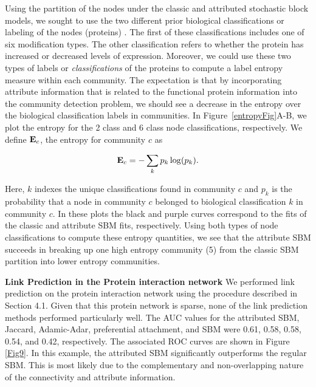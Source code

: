 Using the partition of the nodes under the classic and attributed stochastic block models, we sought to use the two different prior biological classifications or labeling of the nodes (proteins) \cite{bonacci}. The first of these classifications includes one of six modification types. The other classification refers to whether the protein has increased or decreased levels of expression. Moreover, we could use these two types of labels or \emph{classifications} of the proteins to compute a label entropy measure within each community. The expectation is that by incorporating attribute information that is related to the functional protein information into the community detection problem, we should see a decrease in the entropy over the biological classification labels in communities. In Figure~\ref{entropyFig}A-B, we plot the entropy for the 2 class and 6 class node classifications, respectively. We define ${\bf E}_{c}$, the entropy for community $c$ as

\begin{equation}
{\bf E}_{c}=-\sum_{k} p_{k}\log(p_{k}).
\end{equation}

Here, $k$ indexes the unique classifications found in community $c$ and $p_{k}$ is the probability that a node in community $c$ belonged to biological classification $k$ in community $c$. In these plots the black and purple curves correspond to the fits of the classic and attribute SBM fits, respectively. Using both types of node classifications to compute these entropy quantities, we see that the attribute SBM succeeds in breaking up one high entropy community (5) from the classic SBM partition into lower entropy communities. 

{\bf Link Prediction in the Protein interaction network}
We performed link prediction on the protein interaction network using the procedure described in Section 4.1. Given that this protein network is sparse, none of the link prediction methods performed particularly well. The AUC values for the attributed SBM, Jaccard, Adamic-Adar, preferential attachment, and SBM were 0.61, 0.58, 0.58, 0.54, and 0.42, respectively. The associated ROC curves are shown in Figure \ref{Fig9}.  In this example, the attributed SBM significantly outperforms the regular SBM. This is most likely due to the complementary and non-overlapping nature of the connectivity and attribute information. 

